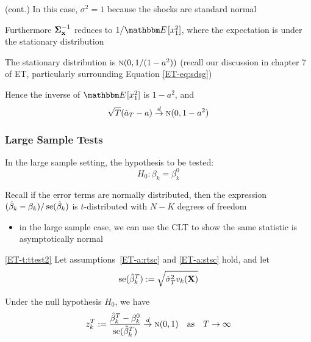 \begin{frame}

    \vspace{2em}
    \Eg(cont.)
    In this case, $\sigma^2  = 1$ because the shocks are standard normal
    
    Furthermore ${\boldsymbol \Sigma_{{\mathbf x}}^{-1}}$ reduces to $1/\EE[x_1^2]$, where the expectation
    is under the stationary distribution
    
    The stationary distribution is $\textrm{\sc n}(0,
    1/(1-a^2))$ (recall our discussion in chapter 7 of ET, particularly surrounding Equation \eqref{ET-eq:sdsg})
    
    Hence the inverse of $\EE[x_1^2]$ is $1 - a^2$, and
    \begin{equation}
        \label{eq:avarrols}
        \sqrt{T} (\hat a_T - a) \stackrel { d } {\to} \textrm{\sc n}(0, 1 - a^2)
    \end{equation}
    
\end{frame}


\begin{frame}\frametitle{Large Sample Tests}
    
    \vspace{2em}
    In the large sample
    setting, the hypothesis to be tested:
    \begin{equation*}
        H_0 \colon \beta_k = \beta_k^0
    \end{equation*}
    
    \vspace{.7em}
    Recall if the error
    terms are normally distributed, then the expression $(\hat \beta_k - \beta_k)
    / \operatorname{se}(\hat \beta_k)$ is $t$-distributed with $N-K$ degrees of freedom
    \begin{itemize}
        \item  in
        the large sample case, we can use the CLT to show the
        same statistic is asymptotically normal
    \end{itemize}
    
\end{frame}

\begin{frame}

    \vspace{2em}
    \Thm
    \eqref{ET-t:ttest2}
    Let assumptions~\ref{ET-a:rtsc} and \ref{ET-a:stsc} hold, and let
    \begin{equation*}
        \operatorname{se}(\hat \beta_k^T) 
        := \sqrt{ \hat \sigma^2_T v_k(\mathbf X) }
    \end{equation*}
    
    \vspace{.7em}
    Under the null hypothesis $H_0$, we have
    \begin{equation}
        \label{eq:ttest2}
        z_k^T := \frac{\hat \beta_k^T - \beta_k^0}{\operatorname{se}(\hat \beta_k^T)}
        \stackrel { d } {\to} \textrm{\sc n}(0,1) 
        \quad \text{as} \quad
        T \to \infty
    \end{equation}
    
\end{frame}

